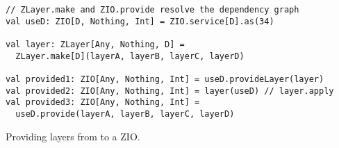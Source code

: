 \begin{algorithm}

\begin{verbatim}
// ZLayer.make and ZIO.provide resolve the dependency graph
val useD: ZIO[D, Nothing, Int] = ZIO.service[D].as(34)

val layer: ZLayer[Any, Nothing, D] =
  ZLayer.make[D](layerA, layerB, layerC, layerD)

val provided1: ZIO[Any, Nothing, Int] = useD.provideLayer(layer)
val provided2: ZIO[Any, Nothing, Int] = layer(useD) // layer.apply
val provided3: ZIO[Any, Nothing, Int] =
  useD.provide(layerA, layerB, layerC, layerD)
\end{verbatim}

\caption{Providing layers from  to a ZIO. \label{zio:zlayer-provide}}
\end{algorithm}